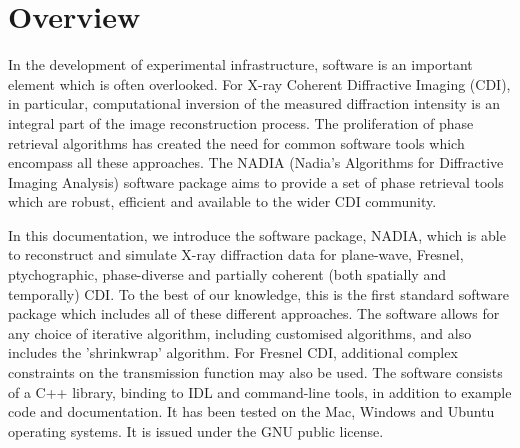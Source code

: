 \documentclass[]{nadia}
\begin{document}




\section{Overview}

In the development of experimental infrastructure, software is an
important element which is often overlooked. For X-ray Coherent
Diffractive Imaging (CDI), in particular, computational inversion of
the measured diffraction intensity is an integral part of the image
reconstruction process. The proliferation of phase retrieval
algorithms has created the need for common software tools which
encompass all these approaches. The NADIA (Nadia's Algorithms for 
Diffractive Imaging Analysis) software package aims to provide a set of phase
retrieval tools which are robust, efficient and available to the wider
CDI community.

In this documentation, we introduce the software package, NADIA, 
which is able to reconstruct and simulate
X-ray diffraction data for plane-wave, Fresnel, ptychographic,
phase-diverse and partially coherent (both spatially and temporally) 
CDI. To the best of our knowledge, this is the first
standard software package which includes all of these different
approaches. The software allows for any choice of iterative algorithm,
including customised algorithms, and also includes the 'shrinkwrap'
algorithm. For Fresnel CDI, additional complex constraints on the
transmission function may also be used. The software consists of a C++
library, binding to IDL and command-line tools, in addition to example
code and documentation. It has been tested on the Mac, Windows and
Ubuntu operating systems. It is issued under the GNU public license.
\end{document}
